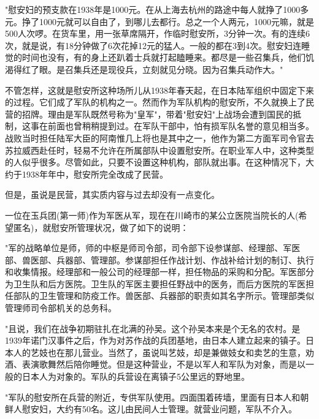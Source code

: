 \documentclass[12pt,UTF8]{ctexbook}
\begin{document}
"慰安妇的预支款在1938年是1000元。在从上海去杭州的路途中每人就挣了1000多元。挣了1000元就可以自由了，到哪儿去都行。总之一个人两元，1000元嘛，就是500人次啰。在货车里，用一张草席隔开，作临时慰安所，3分钟一次。有的连续6次，就是说，有18分钟做了6次花掉12元的猛人。一般的都在3到4次。慰安妇连睡觉的时间也没有，有的身上还趴着士兵就打起瞌睡来。都尽是一些召集兵，他们饥渴得红了眼。是召集兵还是现役兵，立刻就见分晓。因为召集兵动作大。"



不管怎样，这就是慰安所这种场所儿从1938年春天起，在日本陆军组织中固定下来的过程。它们成了军队的机构之一。然而作为军队机构的慰安所，不久就换上了民营的招牌。理由是军队既然号称为"皇军"，带着"慰安妇"上战场会遭到国民的抵制，这事在前面也曾稍稍提到过。在军队干部中，怕有损军队名誉的意见相当多。战败当时担任陆军大臣的阿南惟几上将也是其中之一，他作为第二方面军司令官去苏拉威西赴任时，轻易不允许在所属部队中设置慰安所。在职业军人中，这种类型的人似乎很多。尽管如此，只要不设置这种机构，部队就出事。在这种情况下，大约于1938年年中，慰安所完全改成了民营。



但是，虽说是民营，其实质内容与过去却没有一点变化。



一位在玉兵团(第一师)作为军医从军，现在在川崎市的某公立医院当院长的人(希望匿名)，就慰安所管理状况，做了如下的说明：



"军的战略单位是师，师的中枢是师司令部，司令部下设参谋部、经理部、军医部、兽医部、兵器部、管理部。参谋部担任作战计划、作战补给计划的制订、执行和收集情报。经理部和一般公司的经理部一样，担任物品的采购和分配。军医部分为卫生队和后方医院。卫生队的军医主要担任野战中的医务，而后方医院的军医担任部队的卫生管理和防疫工作。兽医部、兵器部的职责如其名字所示。管理部类似管理师司令部机关的总务科。



"且说，我们在战争初期驻扎在北满的孙吴。这个孙吴本来是个无名的农村。是1939年诺门汉事件之后，作为对苏作战的兵团基地，由日本人建立起来的镇子。日本人的艺妓也在那儿营业。当然了，虽说叫艺妓，却是兼做妓女和卖艺的生意，劝酒、表演歌舞然后陪你睡觉。但是这种营业，不是以军人和军队为对象，而是以一般的日本人为对象的。军队的兵营设在离镇子5公里远的野地里。



"军队的慰安所在兵营的附近，专供军队使用。四面围着砖墙，里面有日本人和朝鲜人慰安妇，大约有50名。这儿由民间人士管理。就营业问题，军队不介入。
\end{document}
